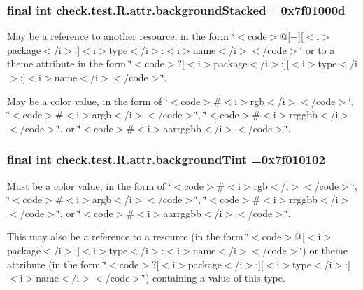 \subsubsection[{background\+Stacked}]{\setlength{\rightskip}{0pt plus 5cm}final int check.\+test.\+R.\+attr.\+background\+Stacked =0x7f01000d\hspace{0.3cm}{\ttfamily [static]}}\label{classcheck_1_1test_1_1_r_1_1attr_a003c234c1dbf40a537758be65695c08b}
May be a reference to another resource, in the form \char`\"{}$<$code$>$@\mbox{[}+\mbox{]}\mbox{[}$<$i$>$package$<$/i$>$\+:\mbox{]}$<$i$>$type$<$/i$>$\+:$<$i$>$name$<$/i$>$$<$/code$>$\char`\"{} or to a theme attribute in the form \char`\"{}$<$code$>$?\mbox{[}$<$i$>$package$<$/i$>$\+:\mbox{]}\mbox{[}$<$i$>$type$<$/i$>$\+:\mbox{]}$<$i$>$name$<$/i$>$$<$/code$>$\char`\"{}. 

May be a color value, in the form of \char`\"{}$<$code$>$\#$<$i$>$rgb$<$/i$>$$<$/code$>$\char`\"{}, \char`\"{}$<$code$>$\#$<$i$>$argb$<$/i$>$$<$/code$>$\char`\"{}, \char`\"{}$<$code$>$\#$<$i$>$rrggbb$<$/i$>$$<$/code$>$\char`\"{}, or \char`\"{}$<$code$>$\#$<$i$>$aarrggbb$<$/i$>$$<$/code$>$\char`\"{}. \hypertarget{classcheck_1_1test_1_1_r_1_1attr_a9fef2f05f0fb4a8733f460d560d8ef0d}{}
\subsubsection[{background\+Tint}]{\setlength{\rightskip}{0pt plus 5cm}final int check.\+test.\+R.\+attr.\+background\+Tint =0x7f010102\hspace{0.3cm}{\ttfamily [static]}}\label{classcheck_1_1test_1_1_r_1_1attr_a9fef2f05f0fb4a8733f460d560d8ef0d}
Must be a color value, in the form of \char`\"{}$<$code$>$\#$<$i$>$rgb$<$/i$>$$<$/code$>$\char`\"{}, \char`\"{}$<$code$>$\#$<$i$>$argb$<$/i$>$$<$/code$>$\char`\"{}, \char`\"{}$<$code$>$\#$<$i$>$rrggbb$<$/i$>$$<$/code$>$\char`\"{}, or \char`\"{}$<$code$>$\#$<$i$>$aarrggbb$<$/i$>$$<$/code$>$\char`\"{}. 

This may also be a reference to a resource (in the form \char`\"{}$<$code$>$@\mbox{[}$<$i$>$package$<$/i$>$\+:\mbox{]}$<$i$>$type$<$/i$>$\+:$<$i$>$name$<$/i$>$$<$/code$>$\char`\"{}) or theme attribute (in the form \char`\"{}$<$code$>$?\mbox{[}$<$i$>$package$<$/i$>$\+:\mbox{]}\mbox{[}$<$i$>$type$<$/i$>$\+:\mbox{]}$<$i$>$name$<$/i$>$$<$/code$>$\char`\"{}) containing a value of this type. \hypertarget{classcheck_1_1test_1_1_r_1_1attr_a30ef6484cfe3015f32395a912756a38f}{}
